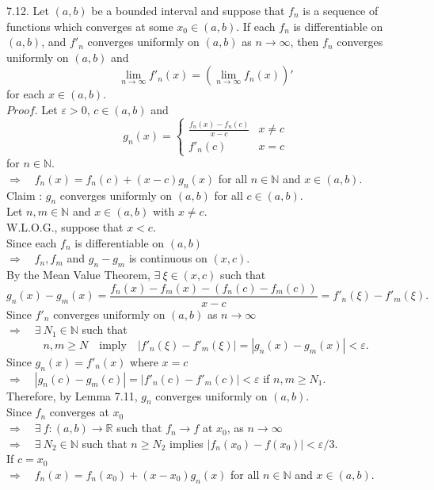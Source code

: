 \documentclass[12pt]{book}
\begin{document}
\begin{CJK}{UTF8}{bsmi}
7.12. Let $(a, b)$ be a bounded interval and suppose that $f_n$ is a sequence of functions which converges at some $x_0\in(a, b)$. If each $f_n$ is differentiable on $(a, b)$, and $f'_n$ converges uniformly on $(a, b)$ as $n\rightarrow\infty$, then $f_n$ converges uniformly on $(a, b)$ and
\[
\lim_{n\rightarrow\infty} f'_n(x) = \left( \lim_{n\rightarrow\infty} f_n(x) \right)'
\]
for each $x\in(a, b)$. \\
$Proof$. Let $\varepsilon>0$, $c\in(a, b)$ and 
\[
g_n(x)=\left\{\begin{matrix}\displaystyle
  \frac{f_n(x)-f_n(c)}{x-c} & x\ne c \\
  f'_n(c) & x=c
\end{matrix}\right.
\]
for $n\in\mathbb{N}$. \\
$\Rightarrow\quad f_n(x)=f_n(c)+(x-c)g_n(x)$ for all $n\in\mathbb{N}$ and $x\in(a, b)$. \\
Claim : $g_n$ converges uniformly on $(a, b)$ for all $c\in(a, b)$. \\
Let $n, m\in\mathbb{N}$ and $x\in(a, b)$ with $x\ne c$. \\
W.L.O.G., suppose that $x<c$. \\
Since each $f_n$ is differentiable on $(a, b)$ \\
$\Rightarrow\quad f_n, f_m$ and $g_n-g_m$ is continuous on $(x, c)$. \\
By the Mean Value Theorem, $\exists\ \xi\in(x, c)$ such that
\[
g_n(x)-g_m(x) = \frac{f_n(x)-f_m(x)-(f_n(c)-f_m(c))}{x-c} = f'_n(\xi)-f'_m(\xi).
\]
Since $f'_n$ converges uniformly on $(a, b)$ as $n\rightarrow\infty$ \\
$\Rightarrow\quad\exists\ N_1\in\mathbb{N}$ such that 
\[
n, m\ge N\quad\text{imply}\quad |f'_n(\xi)-f'_m(\xi)|=|g_n(x)-g_m(x)|<\varepsilon.
\] 
Since $g_n(x)=f'_n(x)$ where $x=c$ \\
$\Rightarrow\quad|g_n(c)-g_m(c)|=|f'_n(c)-f'_m(c)|<\varepsilon$ if $n, m\ge N_1$. \\
Therefore, by Lemma 7.11, $g_n$ converges uniformly on $(a, b)$. \\
Since $f_n$ converges at $x_0$ \\
$\Rightarrow\quad\exists\ f:(a, b)\rightarrow\mathbb{R}$ such that $f_n\rightarrow f$ at $x_0$, as $n\rightarrow\infty$ \\
$\Rightarrow\quad\exists\ N_2\in\mathbb{N}$ such that $n\ge N_2$ implies $|f_n(x_0)-f(x_0)|<\varepsilon/3$. \\
If $c=x_0$ \\
$\Rightarrow\quad f_n(x)=f_n(x_0)+(x-x_0)g_n(x)$ for all $n\in\mathbb{N}$ and $x\in(a, b)$. \\

\end{CJK}
\end{document}
